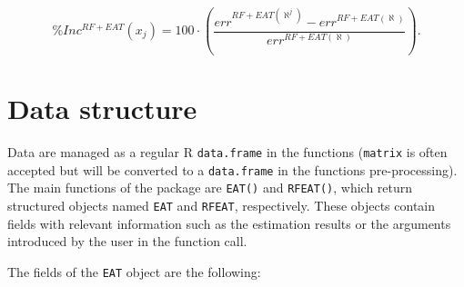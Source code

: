 \begin{equation} \label{(9)} 
\% Inc^{RF+EAT} \left(x_{j} \right)=100\cdot \left(\frac{err^{RF+EAT\left(\aleph ^{j} \right)} -err^{RF+EAT\left(\aleph \right)} }{err^{RF+EAT\left(\aleph \right)}} \right). 
\end{equation}

\hypertarget{section3}{%
\section{Data structure}\label{section3}}

Data are managed as a regular R \texttt{data.frame} in the  functions (\texttt{matrix} is often accepted but will be converted to a \texttt{data.frame} in the functions pre-processing). The main functions of the  package are \texttt{EAT()} and \texttt{RFEAT()}, which return structured objects named \texttt{EAT} and \texttt{RFEAT}, respectively. These objects contain fields with relevant information such as the estimation results or the arguments introduced by the user in the function call.

The fields of the \texttt{EAT} object are the following:

